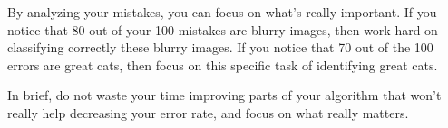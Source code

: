 By analyzing your mistakes, you can focus on what's really important. If you notice that
80 out of your 100 mistakes are blurry images, then work hard on classifying correctly these
blurry images. If you notice that 70 out of the 100 errors are great cats, then focus on this
specific task of identifying great cats.

In brief, do not waste your time improving parts of your algorithm that won't really help
decreasing your error rate, and focus on what really matters.
